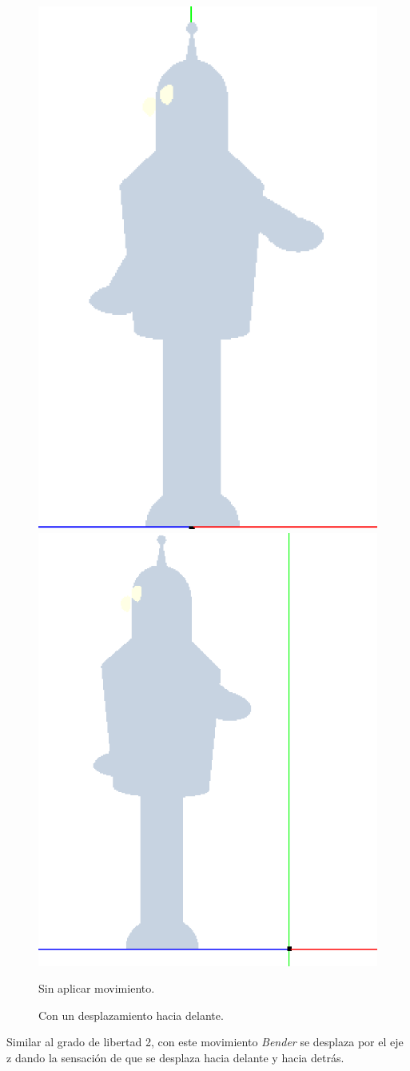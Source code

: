 \documentclass{article}
\begin{document}
	\begin{figure}[h]
		\includegraphics[width=0.34\linewidth]{haciadelante1}
		\includegraphics[width=0.42\linewidth]{haciadelante2}
		\caption{Sin aplicar movimiento.}
		\caption{Con un desplazamiento hacia delante.}
		\label{fig:haciadelante}
	\end{figure}
	
	Similar al grado de libertad 2, con este movimiento \textit{Bender} se desplaza por el eje z dando la sensación de que se desplaza hacia delante y hacia detrás.
	
\end{document}
